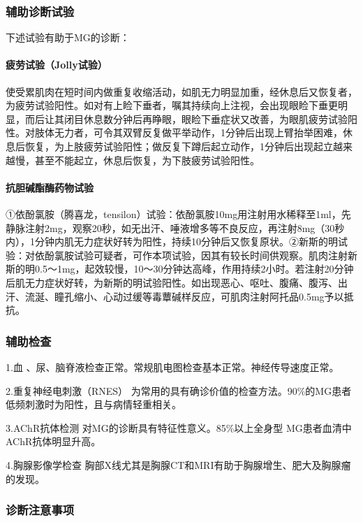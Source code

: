 \subsubsection{辅助诊断试验}

下述试验有助于MG的诊断：

\paragraph{疲劳试验（Jolly试验）}

使受累肌肉在短时间内做重复收缩活动，如肌无力明显加重，经休息后又恢复者，为疲劳试验阳性。如对有上睑下垂者，嘱其持续向上注视，会出现眼睑下垂更明显，而后让其闭目休息数分钟后再睁眼，眼睑下垂症状又改善，为眼肌疲劳试验阳性。对肢体无力者，可令其双臂反复做平举动作，1分钟后出现上臂抬举困难，休息后恢复，为上肢疲劳试验阳性；做反复下蹲后起立动作，1分钟后出现起立越来越慢，甚至不能起立，休息后恢复，为下肢疲劳试验阳性。

\paragraph{抗胆碱酯酶药物试验}

①依酚氯胺（腾喜龙，tensilon）试验：依酚氯胺10mg用注射用水稀释至1ml，先静脉注射2mg，观察20秒，如无出汗、唾液增多等不良反应，再注射8mg（30秒内），1分钟内肌无力症状好转为阳性，持续10分钟后又恢复原状。②新斯的明试验：对依酚氯胺试验可疑者，可作本项试验，因其有较长时间供观察。肌肉注射新斯的明0.5～1mg，起效较慢，10～30分钟达高峰，作用持续2小时。若注射20分钟后肌无力症状好转，为新斯的明试验阳性。如出现恶心、呕吐、腹痛、腹泻、出汗、流涎、瞳孔缩小、心动过缓等毒蕈碱样反应，可肌肉注射阿托品0.5mg予以抵抗。

\subsubsection{辅助检查}

1.血 、尿、脑脊液检查正常。常规肌电图检查基本正常。神经传导速度正常。

2.重复神经电刺激（RNES）
为常用的具有确诊价值的检查方法。90\%的MG患者低频刺激时为阳性，且与病情轻重相关。

3.AChR抗体检测 对MG的诊断具有特征性意义。85\%以上全身型
MG患者血清中AChR抗体明显升高。

4.胸腺影像学检查
胸部X线尤其是胸腺CT和MRI有助于胸腺增生、肥大及胸腺瘤的发现。

\subsubsection{诊断注意事项}

